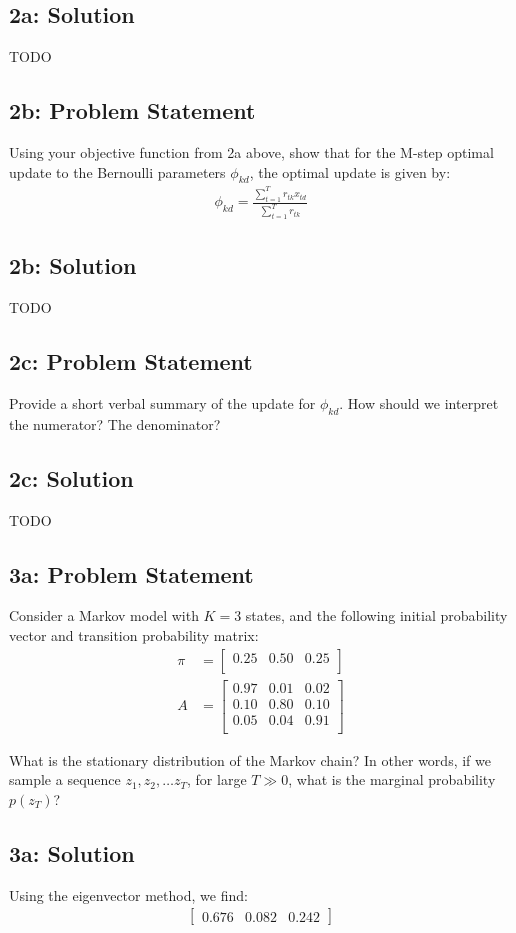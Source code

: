 \documentclass[10pt]{article}
\newcommand{\officialdirections}[1]{{\color{blue} #1}}
\begin{document}
\subsection{2a: Solution}

TODO


\newpage
\officialdirections{
\subsection*{2b: Problem Statement}
Using your objective function from 2a above, show that for the M-step optimal update to the Bernoulli parameters $\phi_{kd}$, the optimal update is given by:
\begin{align}
\phi_{kd} = \frac{ \sum_{t=1}^T r_{tk} x_{td} }{ \sum_{t=1}^T r_{tk} }
\end{align}
}

\subsection{2b: Solution}

TODO


\officialdirections{
\subsection*{2c: Problem Statement}
Provide a short verbal summary of the update for $\phi_{kd}$. How should we interpret the numerator? The denominator?
}

\subsection{2c: Solution}

TODO



\officialdirections{
\subsection*{3a: Problem Statement}
Consider a Markov model with $K=3$ states, and the following initial probability vector and transition probability matrix:
\begin{align}
  \pi &=
  \left[ {\begin{array}{ccc}
   0.25 & 0.50 & 0.25 \\
  \end{array} } \right]
\\
  A &=
  \left[ {\begin{array}{ccc}
   0.97 & 0.01 & 0.02 \\
   0.10 & 0.80 & 0.10 \\
   0.05 & 0.04 & 0.91 \\
  \end{array} } \right]
\end{align}

What is the stationary distribution of the Markov chain?
In other words, if we sample a sequence $z_1, z_2, \ldots z_T$, for large $T \gg 0$, what is the marginal probability $p(z_T)$? 

}

\subsection{3a: Solution}
Using the eigenvector method, we find:
\begin{align}
  \left[ {\begin{array}{ccc}
	0.676 & 0.082 & 0.242
  \end{array} } \right]	
\end{align}
\end{document}
